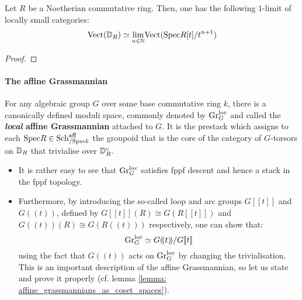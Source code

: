                     \begin{lemma} \label{lemma: vector_bundles_on_the_formal_disc}
                        Let $R$ be a Noetherian commutative ring. Then, one has the following $1$-limit of locally small categories:
                            $$\mathrm{Vect}(\mathbb{D}_R) \simeq \underset{n \in \mathbb{N}}{\operatorname{lim}} \mathrm{Vect}(\mathrm{Spec} R[t]/t^{n + 1})$$
                    \end{lemma}
                        \begin{proof}
                            
                        \end{proof}
                
                \paragraph{The affine Grassmannian}
                    \begin{definition} \label{def: local_affine_grassmannians}
                        For any algebraic group $G$ over some base commutative ring $k$, there is a canonically defined moduli space, commonly denoted by $\mathrm{Gr}_G^{\mathrm{loc}}$ and called the \textbf{\textit{local} affine Grassmannian} attached to $G$. It is the prestack which assigns to each $\mathrm{Spec} R \in \mathrm{Sch}_{/\mathrm{Spec} k}^{\mathrm{aff}}$ the groupoid that is the core of the category of $G$-torsors on $\mathbb{D}_R$ that trivialise over $\mathbb{D}_R^{\circ}$.  
                    \end{definition}
                    \begin{remark}
                        \noindent
                        \begin{itemize}
                            \item It is rather easy to see that $\mathrm{Gr}_G^{\mathrm{loc}}$ satisfies fppf descent and hence a stack in the fppf topology.
                            \item Furthermore, by introducing the so-called loop and arc groups $G[\![t]\!]$ and $G(\!(t)\!)$, defined by $G[\![t]\!](R) \cong G(R[\![t]\!])$ and $G(\!(t)\!)(R) \cong G(R(\!(t)\!))$ respectively, one can show that:
                                $$\mathrm{Gr}_G^{\mathrm{loc}} \simeq G(\!(t)\!)/G[\![t]\!]$$
                            using the fact that $G(\!(t)\!)$ acts on $\mathrm{Gr}_G^{\mathrm{loc}}$ by changing the trivialisation. This is an important description of the affine Grassmannian, so let us state and prove it properly (cf. lemma \ref{lemma: affine_grassmannians_as_coset_spaces}).
                        \end{itemize}
                    \end{remark}
                    
